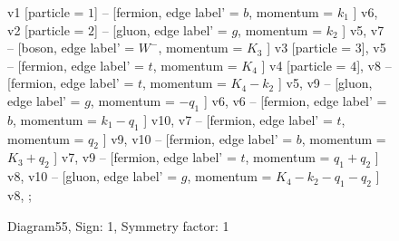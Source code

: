 \documentclass{revtex4}
\begin{document}
\begin{figure}[!htb]
\begin{center}
{    %
v1 [particle = \(1\)] -- [fermion, edge label' = \(b\), momentum = \(k_{1}\) ] v6, 
v2 [particle = \(2\)] -- [gluon, edge label' = \(g\), momentum = \(k_{2}\) ] v5, 
v7 -- [boson, edge label' = \(W^{-}\), momentum = \(K_{3}\) ] v3 [particle = \(3\)], 
v5 -- [fermion, edge label' = \(t\), momentum = \(K_{4}\) ] v4 [particle = \(4\)], 
v8 -- [fermion, edge label' = \(t\), momentum = \(K_{4} - k_{2}\) ] v5, 
v9 -- [gluon, edge label' = \(g\), momentum = \(-q_{1}\) ] v6, 
v6 -- [fermion, edge label' = \(b\), momentum = \(k_{1} - q_{1}\) ] v10, 
v7 -- [fermion, edge label' = \(t\), momentum = \(q_{2}\) ] v9, 
v10 -- [fermion, edge label' = \(b\), momentum = \(K_{3} + q_{2}\) ] v7, 
v9 -- [fermion, edge label' = \(t\), momentum = \(q_{1} + q_{2}\) ] v8, 
v10 -- [gluon, edge label' = \(g\), momentum = \(K_{4} - k_{2} - q_{1} - q_{2}\) ] v8, 
};
\end{center}
\caption{Diagram55, Sign: 1, Symmetry factor: 1}
\end{figure}
\newpage
\end{document}
